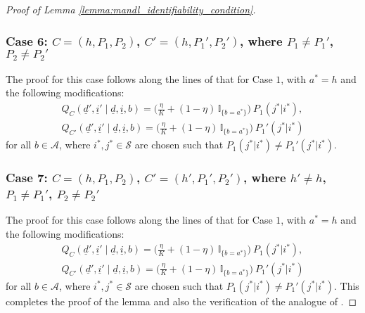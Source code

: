 \begin{proof}[Proof of Lemma \ref{lemma:mandl_identifiability_condition}]
\subsubsection{Case 6: $C=(h, P_1, P_2)$, $C'=(h, P_1', P_2')$, where $P_1\neq P_1'$, $P_2\neq P_2'$}
The proof for this case follows along the lines of that for Case $1$, with $a^*=h$ and the following modifications:
\begin{align}
	Q_C(\underline{d}', \underline{i}'\mid \underline{d}, \underline{i}, b)=\bigg(\frac{\eta}{K}+(1-\eta)\,\mathbb{I}_{\{b=a^*\}}\bigg)~P_1(j^*|i^*),\nonumber\\
	Q_{C'}(\underline{d}', \underline{i}'\mid \underline{d}, \underline{i}, b)=\bigg(\frac{\eta}{K}+(1-\eta)\,\mathbb{I}_{\{b=a^*\}}\bigg)~P_1'(j^*|i^*)
	\label{eq:proof_of_mandl_identifiability_6}
\end{align}
for all $b\in \mathcal{A}$, where $i^*, j^*\in \mathcal{S}$ are chosen such that $P_1(j^*|i^*) \neq P_1'(j^*|i^*)$.

\subsubsection{Case 7: $C=(h, P_1, P_2)$, $C'=(h', P_1', P_2')$, where $h'\neq h$, $P_1\neq P_1'$, $P_2\neq P_2'$}
The proof for this case follows along the lines of that for Case $1$, with $a^*=h$ and the following modifications:
\begin{align}
	Q_C(\underline{d}', \underline{i}'\mid \underline{d}, \underline{i}, b)=\bigg(\frac{\eta}{K}+(1-\eta)\,\mathbb{I}_{\{b=a^*\}}\bigg)~P_1(j^*|i^*),\nonumber\\
	Q_{C'}(\underline{d}', \underline{i}'\mid \underline{d}, \underline{i}, b)=\bigg(\frac{\eta}{K}+(1-\eta)\,\mathbb{I}_{\{b=a^*\}}\bigg)~P_1'(j^*|i^*)
	\label{eq:proof_of_mandl_identifiability_7}
\end{align}
for all $b\in \mathcal{A}$, where $i^*, j^*\in \mathcal{S}$ are chosen such that $P_1(j^*|i^*) \neq P_1'(j^*|i^*)$.
This completes the proof of the lemma and also the verification of the analogue of \cite[Assumption A6.1]{borkar1982identification}.
\end{proof}


